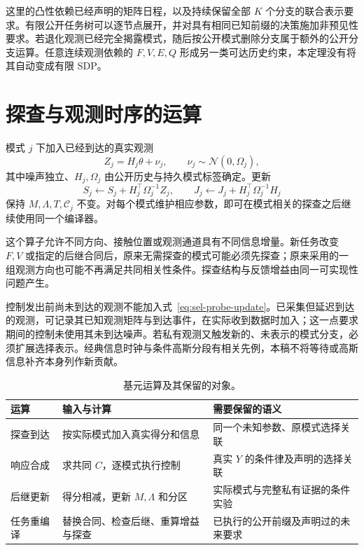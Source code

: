 \documentclass[UTF8,fontset=fandol,11pt,a4paper]{ctexart}
\newcommand{\N}{\mathcal N}
\theoremstyle{definition}
\theoremstyle{remark}
\numberwithin{equation}{section}
\begin{document}
这里的凸性依赖已经声明的矩阵日程，以及持续保留全部 $K$ 个分支的联合表示要求。有限公开任务树可以逐节点展开，并对具有相同已知前缀的决策施加非预见性要求。若退化观测已经完全揭露模式，随后按公开模式删除分支属于额外的公开分支运算。任意连续观测依赖的 $F,V,E,Q$ 形成另一类可达历史约束，本定理没有将其自动变成有限 SDP。

\section{探查与观测时序的运算}
\label{sec:sel-operations}

模式 $j$ 下加入已经到达的真实观测
\begin{equation}
 Z_j=H_j\theta+\nu_j,\qquad\nu_j\sim\N(0,\Omega_j),
 \label{eq:sel-probe}
\end{equation}
其中噪声独立、$H_j,\Omega_j$ 由公开历史与持久模式标签确定。更新
\begin{equation}
 S_j\leftarrow S_j+H_j^\top\Omega_j^{-1}Z_j,\qquad
 J_j\leftarrow J_j+H_j^\top\Omega_j^{-1}H_j
 \label{eq:sel-probe-update}
\end{equation}
保持 $M,\Lambda,T,\mathcal C_j$ 不变。对每个模式维护相应参数，即可在模式相关的探查之后继续使用同一个编译器。

这个算子允许不同方向、接触位置或观测通道具有不同信息增量。新任务改变 $F,V$ 或指定的后继合同后，原来无需探查的模式可能必须先探查；原来采用的一组观测方向也可能不再满足共同相关性条件。探查结构与反馈增益由同一可实现性问题产生。

控制发出前尚未到达的观测不能加入式~\eqref{eq:sel-probe-update}。已采集但延迟到达的观测，可记录其已知观测矩阵与到达事件，在实际收到数据时加入；这一点要求期间的控制未使用其未到达噪声。若私有观测又触发新的、未表示的模式分支，必须扩展选择表示。经典信息时钟与条件高斯分段有相关先例\cite{konev,adusumilli}，本稿不将等待或高斯信息补齐本身列作新贡献。

\begin{table}[htbp]
\centering\small
\caption{基元运算及其保留的对象。}
\begin{tabularx}{\linewidth}{@{}p{23mm}YY@{}}
\toprule
运算 & 输入与计算 & 需要保留的语义 \\
\midrule
探查到达 & 按实际模式加入真实得分和信息 & 同一个未知参数、原模式选择关联 \\
响应合成 & 求共同 $C$，逐模式执行控制 & 真实 $Y$ 的条件律及声明的选择关联 \\
后继更新 & 得分相减，更新 $M,\Lambda$ 和分区 & 实际模式与完整私有证据的条件实验 \\
任务重编译 & 替换合同、检查后继、重算增益与探查 & 已执行的公开前缀及声明过的未来要求 \\
\bottomrule
\end{tabularx}
\end{table}
\end{document}
